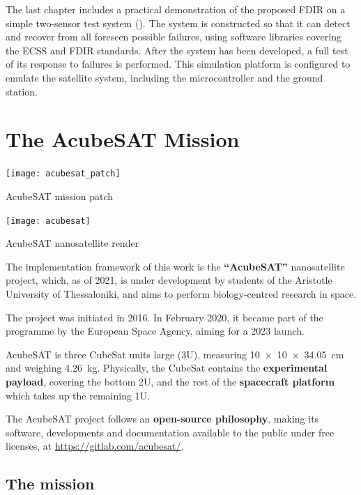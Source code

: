 \documentclass[a4paper,nobib,final]{tufte-book}
\begin{document}
The last chapter includes a practical demonstration of the proposed \acs{FDIR} on a simple two-sensor test system (). The system is constructed so that it can detect and recover from all foreseen possible failures, using software libraries covering the \acs{ECSS} and \acs{FDIR} standards. After the system has been developed, a full test of its response to failures is performed. This simulation platform is configured to emulate the satellite system, including the microcontroller and the ground station.

\chapter{The AcubeSAT Mission}
\label{cap:acubesat}

\begin{marginfigure}
    \texttt{[image: acubesat\_patch]}
    \caption{AcubeSAT mission patch}
\end{marginfigure}

\begin{marginfigure}
    \centering
    \texttt{[image: acubesat]}
    \caption{AcubeSAT nanosatellite render}
\end{marginfigure}


The implementation framework of this work is the \textbf{``AcubeSAT''} nanosatellite project, which, as of 2021, is under development by students of the Aristotle University of Thessaloniki, and aims to perform biology-centred research in space.

The project was initiated in 2016. In February 2020, it became part of the  programme by the European Space Agency, aiming for a 2023 launch.

AcubeSAT is three CubeSat units large (3U), measuring \linebreak[4]\SI[product-units = single]{10 x 10 x 34.05}{\centi\metre} and weighing \SI{4.26}{\kilo\gram}. Physically, the CubeSat contains the \textbf{experimental payload}, covering the bottom 2U, and the rest of the \textbf{spacecraft platform} which takes up the remaining 1U.

The AcubeSAT project follows an \textbf{open-source philosophy}, making its software, developments and documentation available to the public under free licenses, at \url{https://gitlab.com/acubesat/}.

\section{The mission}
\end{document}

